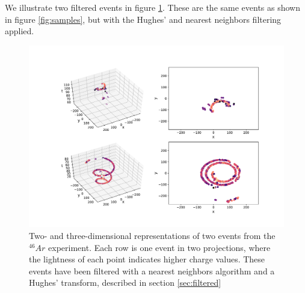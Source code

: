We illustrate two filtered events in figure \ref{fig:samples_filtered}. These are the same events as shown in figure \ref{fig:samples}, but with the Hughes' and nearest neighbors filtering applied. 

\begin{figure}[H]
\centering
\includegraphics[width=\textwidth]{../plots/display_eventsclean_.pdf}
\caption[Displaying filtered events in 2D and 3D]{Two- and three-dimensional representations of two events from the ${}^{46}Ar$ experiment. Each row is one event in two projections, where the lightness of each point indicates higher charge values. These events have been filtered with a nearest neighbors algorithm and a Hughes' transform, described in section \ref{sec:filtered}}\label{fig:samples_filtered}
\end{figure}

